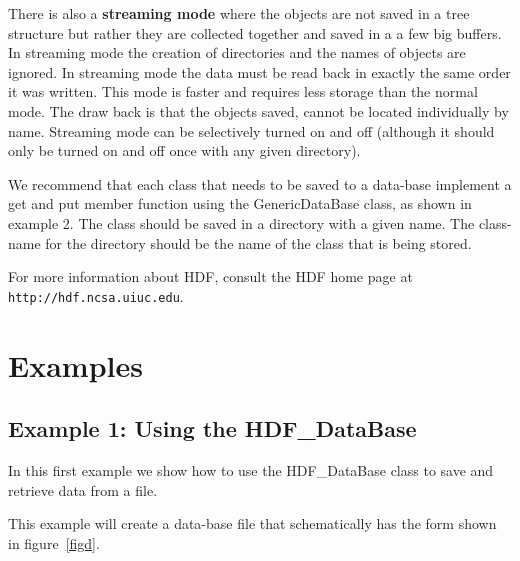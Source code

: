 \documentclass{article}
\begin{document}
There is also a {\bf streaming mode} where the objects are not saved in a tree structure 
but rather they are collected together and saved in a a few big buffers. In streaming mode 
the creation of directories and the names of objects are ignored.  In streaming mode the
data must be read back in exactly the same order it was written. This mode is faster and
requires less storage than the normal mode. The draw back is that the objects saved,
cannot be located individually by name. Streaming mode can be selectively turned on and off 
(although it should only be turned on and off once with any given directory).


We recommend that each class that needs to be saved to a data-base
implement a {\ff get} and {\ff put} member function using the {\ff
GenericDataBase} class, as shown in example 2.  The class should be
saved in a directory with a given name. The class-name for the
directory should be the name of the class that is being stored.


For more information about HDF, consult the HDF home page at {\tt http://hdf.ncsa.uiuc.edu}.

\vfill\eject
\section{Examples}

\subsection{Example 1: Using the HDF\_DataBase}

In this first example we show how to use the {\ff HDF\_DataBase} class to
save and retrieve data from a file.


This example will create a data-base file that schematically 
has the form shown in figure~\ref{figd}.

\end{document}
